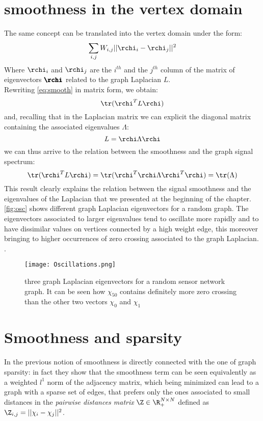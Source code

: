 \section{smoothness in the vertex domain}
The same concept can be translated into the vertex domain under the form:
\begin{equation}
\sum_{i,j}W_{i,j}||\rchi_i - \rchi_j||^2
\label{eq:smoothVertex}
\end{equation}
Where $\rchi_i$ and $\rchi_j$ are the $i^{th}$ and the $j^{th}$ column of the matrix of eigenvectors $\pmb{\rchi}$ related to the graph Laplacian $L$.\\
Rewriting \autoref{eq:smooth} in matrix form, we obtain\cite{Kalofolias2016}:
\begin{equation}
\tr(\rchi^T L \rchi)
\label{eq:smoothMatrix}
\end{equation}
and, recalling that in the Laplacian matrix we can explicit the diagonal matrix containing the associated eigenvalues $\Lambda$:
\begin{equation}
L = \rchi \Lambda \rchi
\label{eq:diag}
\end{equation}
we can thus arrive to the relation between the smoothness and the graph signal spectrum:
\begin{equation}
\tr(\rchi^T L \rchi) = \tr(\rchi^T \rchi \Lambda \rchi^T \rchi) = \tr(\Lambda)
\end{equation}
This result clearly explains the relation between the signal smoothness and the eigenvalues of the Laplacian that we presented at the beginning of the chapter.\autoref{fig:osc} shows different graph Laplacian eigenvectors for a random graph. The eigenvectors associated to larger eigenvalues tend to oscillate more rapidly and to have dissimilar values on vertices connected by a high weight edge, this moreover bringing to higher occurrences of zero crossing associated to the graph Laplacian. \cite{Shuman2013}.

\begin{figure}[tb]
\centering
\texttt{[image: Oscillations.png]}
\caption{three graph Laplacian eigenvectors for a random sensor network graph. It can be seen how $\chi_{50}$ contains definitely more zero crossing than the other two vectors $\chi_0$ and $\chi_1$}
\label{fig:osc}
\end{figure}

\section{Smoothness and sparsity}
In \cite{Kalofolias2016} the previous notion of smoothness is directly connected with the one of graph sparsity: in fact they show that the smoothness term can be seen equivalently as a weighted $l^1$ norm of the adjacency matrix, which being minimized can lead to a graph with a sparse set of edges, that prefers only the ones associated to small distances in the \textit{pairwise distances matrix} $\Z \in \R^{N\times N}_+$ defined as $\Z_{i,j} = ||\chi_i - \chi_j||^2$.


